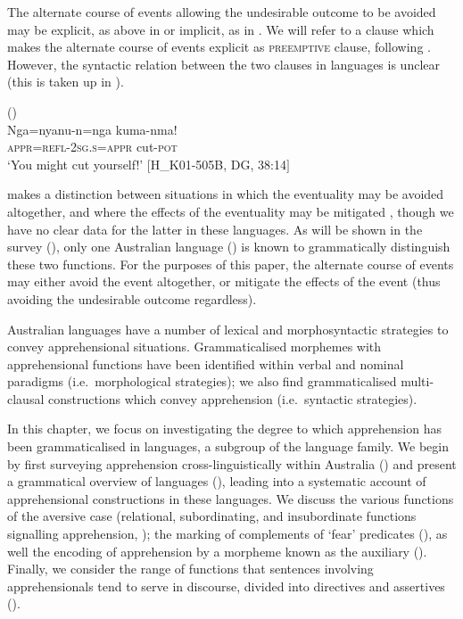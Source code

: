 \documentclass[output=paper,colorlinks,citecolor=brown]{langscibook}
\begin{document}
 The alternate course of events allowing the undesirable outcome to be avoided may be explicit, as above in  or implicit, as in . We will refer to a clause which makes the alternate course of events explicit as \textsc{preemptive} clause, following \citet[265]{evans_current_1995}. However, the syntactic relation between the two clauses in  languages is unclear (this is taken up in ).

\ea 
\textnormal{ ()}\\
\gll Nga=nyanu-n=nga kuma-nma! \\
\textsc{appr=refl-2sg.s=appr} cut-\textsc{pot} \\
\glt `You might cut yourself!' $[$H\_K01-505B, DG, 38:14$]$ \\
\label{ex:bro2}
\z

 \citeauthor{lichtenberk_apprehensional_1995} makes a distinction between situations in which the eventuality may be avoided altogether, and where the effects of the eventuality may be mitigated \citep[297]{lichtenberk_apprehensional_1995}, though we have no clear data for the latter in these languages. As will be shown in the survey (), only one Australian language () is known to grammatically distinguish these two functions. For the purposes of this paper, the alternate course of events may either avoid the event altogether, or mitigate the effects of the event (thus avoiding the undesirable outcome regardless).

Australian languages have a number of lexical and morphosyntactic strategies to convey apprehensional situations. Grammaticalised morphemes with apprehensional functions have been identified within verbal and nominal paradigms (i.e.\  morphological strategies); we also find grammaticalised multi-clausal constructions which convey apprehension (i.e.\  syntactic strategies).

In this chapter, we focus on investigating the degree to which apprehension has been grammaticalised in  languages, a subgroup of the  language family. We begin by first surveying apprehension cross-linguistically within Australia () and present a grammatical overview of  languages (), leading into a systematic account of apprehensional constructions in these languages. We discuss the various functions of the aversive case (relational, subordinating, and insubordinate functions signalling apprehension, ); the marking of complements of `fear' predicates (), as well the encoding of apprehension by a morpheme known as the auxiliary (). Finally, we consider the range of functions that sentences involving apprehensionals tend to serve in discourse, divided into directives and assertives (). 
\end{document}
